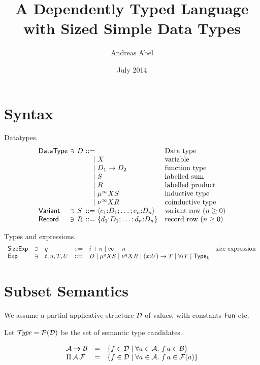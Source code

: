 \documentclass{article}
\title{A Dependently Typed Language with Sized Simple Data Types}
\author{Andreas Abel}
\date{July 2014}
\begin{document}
\maketitle

\section{Syntax}

Datatypes.
\[
\begin{array}{l@{~}l@{~}l@{~}r@{~}ll}
\DataType & \ni & D & ::= &      & \mbox{Data type}
  \\ &&& \mid & X                & \mbox{variable}
  \\ &&& \mid & D_1 \to D_2      & \mbox{function type}
  \\ &&& \mid & S                & \mbox{labelled sum}
  \\ &&& \mid & R                & \mbox{labelled product}
  \\ &&& \mid & \smu \infty X S  & \mbox{inductive type}
  \\ &&& \mid & \snu \infty X R  & \mbox{coinductive type}
\\
  \Variant & \ni & S      & ::= & \langle c_1 \of D_1 ; \dots ;
    c_n \of D_n \rangle
    & \mbox{variant row} \ (n \geq 0)
\\
  \Record  & \ni & R      & ::= & \{ d_1 \of D_1 ;\dots ;
    d_n \of D_n \}
    & \mbox{record row} \ (n \geq 0)
\end{array}
\]

Types and expressions.
\[
\begin{array}{lllrll}
\mathsf{SizeExp}  & \ni & q & ::= & i + n \mid \infty + n
  & \mbox{size expression} \\
\mathsf{Exp} & \ni & t,u,T,U & ::= & D
  \mid \mu^{q} X S
  \mid \nu^{q} X R
  \mid (x {:} U) \to T
  \mid \forall i T
  \mid \mathsf{Type}_k
\end{array}
\]

\section{Subset Semantics}

We assume a partial applicative structure $\mathcal{D}$ of values, with
constants $\mathsf{Fun}$ etc.

Let $\mathcal{T}\!\mathit{ype} = \mathcal{P}(\mathcal{D})$ be the set of semantic type candidates.

\[
\begin{array}{lll}
  \mathcal{A} \pmb{\to} \mathcal{B} & = & \{ f \in \mathcal{D} \mid \forall a \in \mathcal{A}.\ f\,a \in \mathcal{B} \}
\\
  \Pi\,\mathcal{A}\,\mathcal{F} & = & \{ f \in \mathcal{D} \mid \forall a \in \mathcal{A}.\ f\,a \in \mathcal{F}(a) \}
\end{array}
\]
\end{document}

